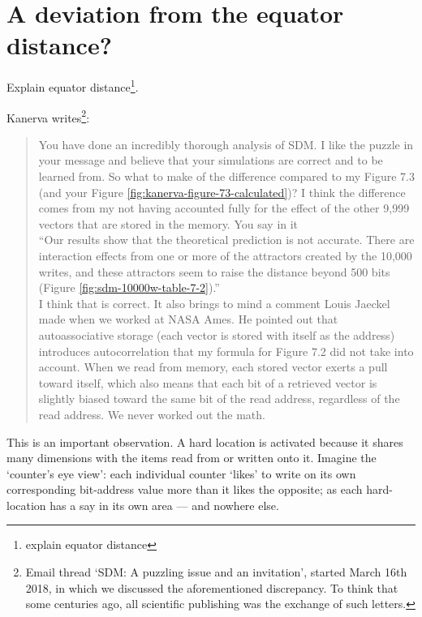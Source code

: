 
\section{A deviation from the equator distance?}

Explain equator distance\footnote{explain equator distance}.

Kanerva writes\footnote{Email thread `SDM: A puzzling issue and an invitation', started March  16th 2018, in which we discussed the aforementioned discrepancy.  To think that some centuries ago, all scientific publishing was the exchange of such letters.}:

\begin{quote}
    You have done an incredibly thorough analysis of SDM. I like the puzzle in your message and believe that your simulations are correct and to be learned from.  So what to make of the difference compared to my Figure 7.3 (and your Figure \ref{fig:kanerva-figure-73-calculated})?  I think the difference comes from my not having accounted fully for the effect of the other 9,999 vectors that are stored in the memory.  You say in it\\

   ``Our results show that the theoretical prediction is not accurate. There are interaction effects from one or more of the attractors created by the 10,000 writes, and these attractors seem to raise the distance beyond 500 bits (Figure \ref{fig:sdm-10000w-table-7-2}).'' \\

   I think that is correct.  It also brings to mind a comment Louis Jaeckel made when we worked at NASA Ames.  He pointed out that autoassociative storage (each vector is stored with itself as the address) introduces autocorrelation that my formula for Figure 7.2 did not take into account.  When we read from memory, each stored vector exerts a pull toward itself, which also means that each bit of a retrieved vector is slightly biased toward the same bit of the read address, regardless of the read address.  We never worked out the math.
\end{quote}

This is an important observation. A hard location is activated because it shares many dimensions with the items read from or written onto it. Imagine the `counter's eye view':  each individual counter `likes' to write on its own corresponding bit-address value more than it likes the opposite; as each hard-location has a say in its own area --- and nowhere else.

